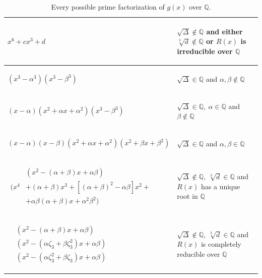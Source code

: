 \documentclass[11pt,a4paper]{article}
\numberwithin{equation}{section}
\newcommand{\Q}{\mathbb{Q}}
\theoremstyle{definition}
\begin{document}
\begin{table}[ht]
\centering
 \begin{tabular}{| m{7.5cm} | m{7.5cm} |}
  \hline
  \begin{center} $x^6+cx^3+d$ \end{center} & 
  \begin{center} $\sqrt\Delta\notin\Q$ and either $\sqrt[3]{d}\notin\Q$ or $R(x)$ is irreducible over $\Q$   \end{center}\\
  \hline
  \begin{center} $(x^3-\alpha^3)(x^3-\beta^3)$ \end{center}&
  \begin{center} $\sqrt\Delta\in\Q$ and $\alpha,\beta\notin\Q$ \end{center}\\
  \hline
  \begin{center} $(x-\alpha)(x^2+\alpha x+\alpha^2)(x^3-\beta^3)$ \end{center}&
  \begin{center} $\sqrt\Delta\in\Q,\:\alpha\in\Q$ and $\beta\notin\Q$ \end{center}\\
  \hline
  \begin{center} $(x-\alpha)(x-\beta)(x^2+\alpha x+\alpha^2)(x^2+\beta x+\beta^2)$ \end{center}&
  \begin{center} $\sqrt\Delta\in\Q$ and $\alpha,\beta\in\Q$ \end{center}\\
  \hline
  \begin{center} $\begin{aligned}&\left(x^2-(\alpha+\beta)x+\alpha\beta\right)\\ \big(x^4&+(\alpha+\beta)x^3+[(\alpha+\beta)^2-\alpha\beta]x^2+\\ &+\alpha\beta(\alpha+\beta)x+\alpha^2\beta^2\big)\end{aligned}$\end{center}&
  \begin{center} $\sqrt\Delta\notin\Q,\:\sqrt[3]{d}\in\Q$ and $R(x)$ has a unique root in $\Q$ \end{center}\\
  \hline
  \begin{center} $\begin{aligned}&\left(x^2-(\alpha+\beta)x+\alpha\beta\right)\\ &\left(x^2-(\alpha\zeta_3+\beta\zeta_3^2)x+\alpha\beta\right)\\ &\left(x^2-(\alpha\zeta_3^2+\beta\zeta_3)x+\alpha\beta\right)\end{aligned}$\end{center}&
  \begin{center} $\sqrt\Delta\notin\Q,\:\sqrt[3]{d}\in\Q$ and $R(x)$ is completely reducible over $\Q$ \end{center}\\
  \hline
 \end{tabular}
 \caption{Every possible prime factorization of $g(x)$ over $\Q$.}
 \label{factor}
\end{table}
\end{document}

